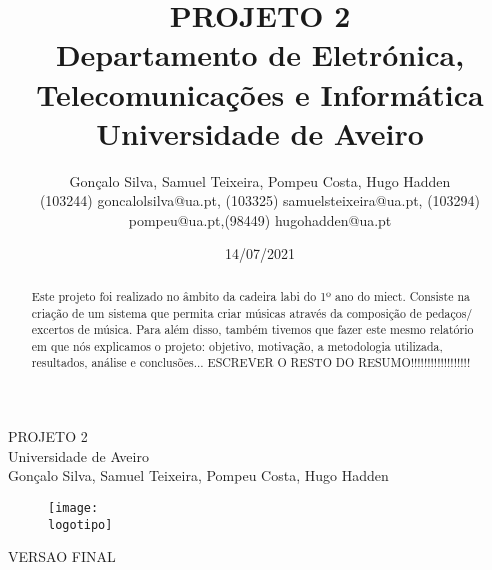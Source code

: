 \documentclass{report}
\begin{document}
%
\def\titulo{PROJETO 2}
\def\data{14/07/2021}
\def\autores{Gonçalo Silva, Samuel Teixeira, Pompeu Costa, Hugo Hadden}
\def\autorescontactos{(103244) goncalolsilva@ua.pt, (103325) samuelsteixeira@ua.pt,
(103294) pompeu@ua.pt,(98449) hugohadden@ua.pt}
\def\versao{VERSAO FINAL}
\def\departamento{Departamento de Eletrónica, Telecomunicações e
Informática}
\def\empresa{Universidade de Aveiro}
\def\logotipo{ua.pdf}
%
%
\renewcommand{\contentsname}{Índice}
\begin{titlepage}

\begin{center}
%
\vspace*{50mm}
%
{\Huge \titulo}\\ 
%
\vspace{10mm}
%
{\Large \empresa}\\
%
\vspace{10mm}
%
{\LARGE \autores}\\ 
%
\vspace{30mm}
%
\begin{figure}[h]
\center
\texttt{[image: \\logotipo]}
\end{figure}
%
\vspace{30mm}
\end{center}
%
\begin{flushright}
\versao
\end{flushright}
\end{titlepage}

\title{%
{\Huge\textbf{\titulo}}\\
{\Large \departamento\\ \empresa}
}
%
\author{%
    \autores \\
    \autorescontactos
}
%
\date{\data}
%
\maketitle


\begin{abstract}
Este projeto foi realizado no âmbito da cadeira \ac{labi} do 1º ano do \ac{miect}. Consiste na criação de um sistema que permita criar músicas através da composição de pedaços/ excertos de música. Para além disso, também tivemos que fazer
este mesmo relatório em que nós explicamos o projeto: objetivo, motivação, a
metodologia utilizada, resultados, análise e conclusões... 
ESCREVER O RESTO DO RESUMO!!!!!!!!!!!!!!!!!!
\end{abstract}
\end{document}
